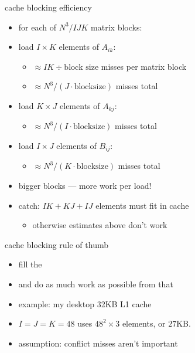 \begin{frame}{cache blocking efficiency}
\begin{itemize}
\item for each of $N^3/IJK$ matrix blocks:
\item load $I\times K$ elements of $A_{ik}$: 
    \begin{itemize}
        \item $\approx IK\div \text{block size}$ misses per matrix block
        \item $\approx N^3/(J\cdot\text{blocksize})$ misses total
    \end{itemize}
\item load $K\times J$ elements of $A_{kj}$: 
    \begin{itemize}
        \item $\approx N^3/(I\cdot\text{blocksize})$ misses total
    \end{itemize}
\item load $I\times J$ elements of $B_{ij}$:
    \begin{itemize}
        \item $\approx N^3/(K\cdot\text{blocksize})$ misses total
    \end{itemize}
\item bigger blocks --- more work per load!
\item catch: $IK+KJ+IJ$ elements must fit in cache
    \begin{itemize}
    \item otherwise estimates above don't work
    \end{itemize}
\end{itemize}
\end{frame}

\begin{frame}{cache blocking rule of thumb}
\begin{itemize}
\item fill the 
\item and do as much work as possible from that
\item example: my desktop 32KB L1 cache
\item $I=J=K=48$ uses $48^2\times 3$ elements, or $27$KB.
\item assumption: conflict misses aren't important
\end{itemize}
\end{frame}


